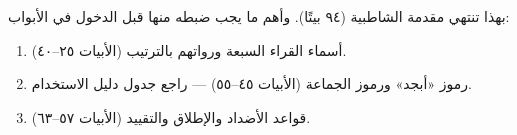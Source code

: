 \begin{khulasa}
بهذا تنتهي مقدمة الشاطبية (٩٤ بيتًا). وأهم ما يجب ضبطه منها قبل الدخول في الأبواب:
\begin{enumerate}
\item أسماء القراء السبعة ورواتهم بالترتيب (الأبيات ٢٥–٤٠).
\item رموز «أبجد» ورموز الجماعة (الأبيات ٤٥–٥٥) — راجع جدول دليل الاستخدام.
\item قواعد الأضداد والإطلاق والتقييد (الأبيات ٥٧–٦٣).
\end{enumerate}
\end{khulasa}
